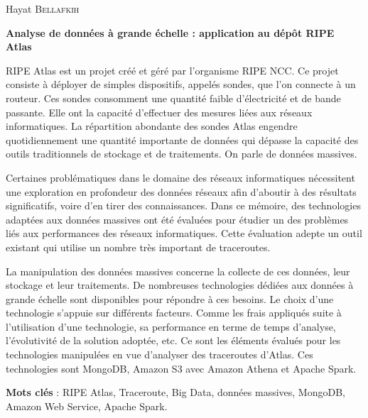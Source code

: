 \documentclass[]{report}
\title{}
\author{}
\begin{document}
\begin{center}
	Hayat  \textsc{Bellafkih}
\end{center}
\vspace{5mm}

\begin{center}
\textbf{Analyse de données à grande échelle : application au dépôt RIPE Atlas}
\end{center}




\vspace{15mm}
RIPE Atlas est un projet créé et géré par l'organisme RIPE NCC.  Ce projet consiste  à déployer de
simples dispositifs, appelés sondes, que l'on  connecte à un routeur. Ces sondes consomment une quantité
faible d'électricité et de bande passante. Elle ont la capacité d'effectuer des mesures liées aux réseaux informatiques.
La répartition abondante des sondes Atlas engendre quotidiennement une quantité importante
de données qui dépasse la capacité des outils traditionnels de stockage et de traitements. On parle de données massives. 

Certaines problématiques dans le domaine des réseaux
informatiques nécessitent une exploration en profondeur des données réseaux afin d'aboutir à des
résultats significatifs, voire d'en tirer des connaissances. Dans ce mémoire, des technologies adaptées aux données massives ont été évaluées pour étudier un des problèmes liés aux performances des réseaux informatiques. Cette  évaluation adepte un outil existant qui utilise    un nombre très important de traceroutes. 


La manipulation des données massives concerne la collecte de ces données, leur stockage et leur traitements. De nombreuses  technologies dédiées aux données à grande échelle  sont disponibles pour répondre à ces besoins. Le choix d'une technologie s'appuie sur différents facteurs. Comme les frais appliqués suite à l'utilisation d'une technologie, sa performance en terme de temps d'analyse, l'évolutivité de la solution adoptée, etc. Ce sont les éléments évalués pour les technologies manipulées en vue d'analyser des traceroutes d'Atlas. Ces technologies sont MongoDB, Amazon S3 avec Amazon Athena et Apache Spark.






\textbf{Mots clés} : RIPE Atlas, Traceroute,  Big Data, données massives, MongoDB, Amazon Web Service, Apache Spark.
\end{document}
